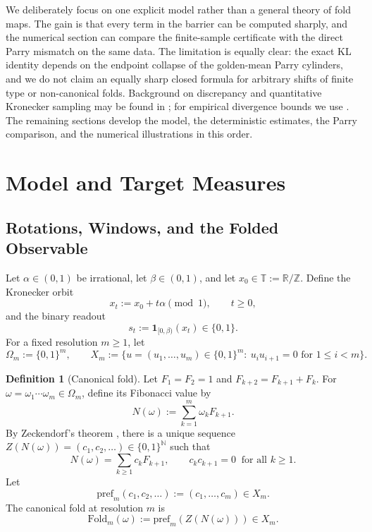 \documentclass[11pt,letterpaper]{article}
\numberwithin{equation}{section}
\theoremstyle{plain}
\theoremstyle{definition}
\newtheorem{definition}[theorem]{Definition}
\theoremstyle{remark}
\newcommand{\TT}{\mathbb{T}}
\newcommand{\Fold}{\mathrm{Fold}}
\newcommand{\pref}{\mathrm{pref}}
\begin{document}
We deliberately focus on one explicit model rather than a general theory of
fold maps. The gain is that every term in the barrier can be computed sharply,
and the numerical section can compare the finite-sample certificate with the
direct Parry mismatch on the same data. The limitation is equally clear: the
exact KL identity depends on the endpoint collapse of the golden-mean Parry
cylinders, and we do not claim an equally sharp closed formula for arbitrary
shifts of finite type or non-canonical folds. Background on discrepancy and
quantitative Kronecker sampling may be found in
\cite{KuipersNiederreiter1974,Goda2024QuasiUniformKronecker}; for empirical
divergence bounds we use
\cite{WeissmanEtAl2003L1Empirical,SasonVerdu2016fDivergence,
DemboZeitouni2010LargeDeviations}. The remaining sections develop the model,
the deterministic estimates, the Parry comparison, and the numerical
illustrations in this order.

\section{Model and Target Measures}

\subsection{Rotations, Windows, and the Folded Observable}

Let $\alpha\in(0,1)$ be irrational, let $\beta\in(0,1)$, and let
$x_0\in\TT:=\mathbb{R}/\mathbb{Z}$.  Define the Kronecker orbit
\[
x_t:=x_0+t\alpha \pmod 1,\qquad t\ge 0,
\]
and the binary readout
\[
s_t:=\mathbf{1}_{[0,\beta)}(x_t)\in\{0,1\}.
\]
For a fixed resolution $m\ge 1$, let
\[
\Omega_m:=\{0,1\}^m,\qquad
X_m:=\{u=(u_1,\dots,u_m)\in\{0,1\}^m:\ u_i u_{i+1}=0\text{ for }1\le i<m\}.
\]

\begin{definition}[Canonical fold]\label{def:canonical-fold}
Let \(F_1=F_2=1\) and \(F_{k+2}=F_{k+1}+F_k\). For
\(\omega=\omega_1\cdots\omega_m\in\Omega_m\), define its Fibonacci value by
\[
N(\omega):=\sum_{k=1}^m \omega_k F_{k+1}.
\]
By Zeckendorf's theorem \cite{Zeckendorf1972}, there is a unique sequence
\(Z(N(\omega))=(c_1,c_2,\dots)\in\{0,1\}^{\mathbb{N}}\) such that
\[
N(\omega)=\sum_{k\ge 1} c_k F_{k+1},
\qquad
c_kc_{k+1}=0\ \text{ for all }k\ge 1.
\]
Let
\[
\pref_m(c_1,c_2,\dots):=(c_1,\dots,c_m)\in X_m.
\]
The canonical fold at resolution \(m\) is
\[
\Fold_m(\omega):=\pref_m(Z(N(\omega)))\in X_m.
\]
\end{definition}
\end{document}
